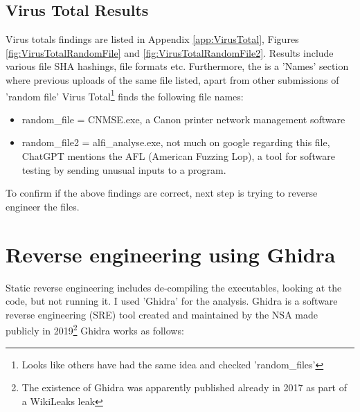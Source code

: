 \documentclass[
	letterpaper, %
	10pt, %
	unnumberedsections, %
	twoside, %
]{APAAssignment}
\begin{document}
\subsection{Virus Total Results} Virus totals findings are listed in Appendix \ref{app:VirusTotal}, Figures \ref{fig:VirusTotalRandomFile} and \ref{fig:VirusTotalRandomFile2}. Results include various file SHA hashings, file formats etc. Furthermore, the is a 'Names' section where previous uploads of the same file listed, apart from other submissions of 'random file' Virus Total\footnote{Looks like others have had the same idea and checked 'random\_files'} finds the following file names:

\begin{itemize}
	\item random\_file = CNMSE.exe, a Canon printer network management software
	\item random\_file2 = alfi\_analyse.exe, not much on google regarding this file, ChatGPT mentions the AFL (American Fuzzing Lop)\cite{AFLWiki}, a tool for software testing by sending unusual inputs to a program. 
\end{itemize}

To confirm if the above findings are correct, next step is trying to reverse engineer the files.

\section{Reverse engineering using Ghidra}
Static reverse engineering includes de-compiling the executables, looking at the code, but not running it. I used 'Ghidra'\cite{Ghidra} for the analysis. 
Ghidra is a software reverse engineering (SRE) tool created and maintained by the NSA\cite{GhidraGithub} made publicly in 2019\footnote{The existence of Ghidra was apparently published already in 2017 as part of a WikiLeaks leak\cite{Vault7leak}} 
Ghidra works as follows:
\end{document}
